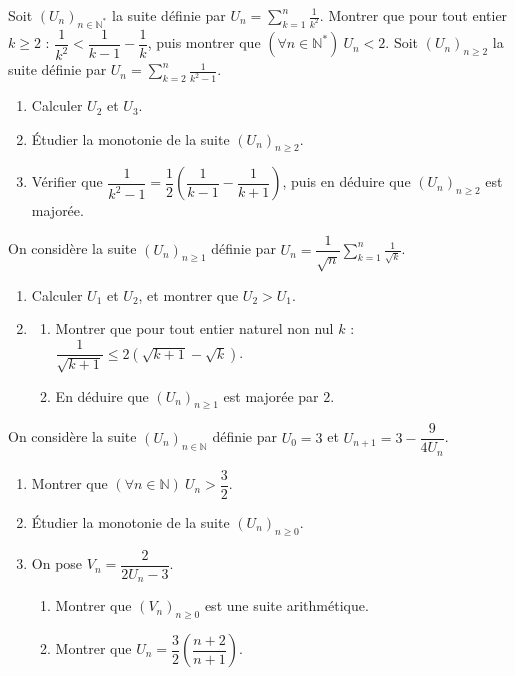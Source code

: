 Soit $(U_n)_{n\in\mathbb{N}^*}$ la suite définie par $U_n=\displaystyle\sum_{k=1}^{n}\frac{1}{k^2}$.
Montrer que pour tout entier $k\geq 2$ : $\dfrac{1}{k^2}<\dfrac{1}{k-1}-\dfrac{1}{k}$, puis montrer que $(\forall n\in\mathbb{N}^*)\ U_n<2$.
\fin
{}
Soit $(U_n)_{n\geq 2}$ la suite définie par $U_n=\displaystyle\sum_{k=2}^{n}\frac{1}{k^2-1}$.
\begin{enumerate}
\item Calculer $U_2$ et $U_3$.
\item Étudier la monotonie de la suite $(U_n)_{n\geq2}$.
\item Vérifier que $\dfrac{1}{k^2-1}=\dfrac12\left(\dfrac{1}{k-1}-\dfrac{1}{k+1}\right)$, puis en déduire que $(U_n)_{n\geq2}$ est majorée.
\end{enumerate}
\fin
{}
On considère la suite $(U_n)_{n\geq1}$ définie par $U_n=\dfrac{1}{\sqrt n}\displaystyle\sum_{k=1}^{n}\frac{1}{\sqrt k}$.
\begin{enumerate}
\item Calculer $U_1$ et $U_2$, et montrer que $U_2>U_1$.
\item \begin{enumerate}
\item Montrer que pour tout entier naturel non nul $k$ : $\dfrac{1}{\sqrt{k+1}}\leq 2\left(\sqrt{k+1}-\sqrt k\right)$.
\item En déduire que $(U_n)_{n\geq1}$ est majorée par $2$.
\end{enumerate}
\end{enumerate}
\fin
{}
On considère la suite $(U_n)_{n\in\mathbb{N}}$ définie par $U_0=3$ et $U_{n+1}=3-\dfrac{9}{4U_n}$.
\begin{enumerate}
\item Montrer que $(\forall n\in\mathbb{N})\ U_n>\dfrac32$.
\item Étudier la monotonie de la suite $(U_n)_{n\geq0}$.
\item On pose $V_n=\dfrac{2}{2U_n-3}$.
\begin{enumerate}
\item Montrer que $(V_n)_{n\geq0}$ est une suite arithmétique.
\item Montrer que $U_n=\dfrac32\left(\dfrac{n+2}{n+1}\right)$.
\end{enumerate}
\end{enumerate}
\fin
{}
